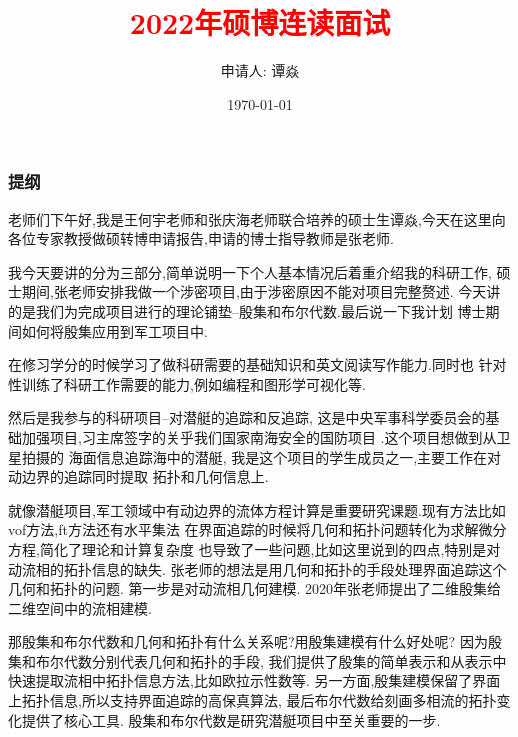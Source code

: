 \documentclass[UTF8]{ctexbeamer}	%
\title{\textcolor{red}{2022年硕博连读面试}}
\author{申请人: 谭焱 
 }
\institute{\small{现硕士导师: 王何宇 、张庆海 \newline 拟转博士指导教师: 张庆海} \newline   \newline 浙江大学数学科学学院}
\date{\today}
\theoremstyle{plain}
\theoremstyle{definition}
\theoremstyle{remark}
\numberwithin{equation}{section}
\begin{document}
\begin{frame}
  \titlepage
\end{frame}


\begin{frame}
  \frametitle{提纲}
  \tableofcontents
\end{frame}

\begin{frame}
  老师们下午好,我是王何宇老师和张庆海老师联合培养的硕士生谭焱,今天在这里向
  各位专家教授做硕转博申请报告,申请的博士指导教师是张老师.
\end{frame}

\begin{frame}
  我今天要讲的分为三部分,简单说明一下个人基本情况后着重介绍我的科研工作,
  硕士期间,张老师安排我做一个涉密项目,由于涉密原因不能对项目完整赘述.
  今天讲的是我们为完成项目进行的理论铺垫--殷集和布尔代数.最后说一下我计划
  博士期间如何将殷集应用到军工项目中.
\end{frame}

\begin{frame}
  在修习学分的时候学习了做科研需要的基础知识和英文阅读写作能力.同时也
  针对性训练了科研工作需要的能力,例如编程和图形学可视化等.
\end{frame}

\begin{frame}
  然后是我参与的科研项目--对潜艇的追踪和反追踪,
  这是中央军事科学委员会的基础加强项目,习主席签字的关乎我们国家南海安全的国防项目
  .这个项目想做到从卫星拍摄的
  海面信息追踪海中的潜艇,
  我是这个项目的学生成员之一,主要工作在对动边界的追踪同时提取
  拓扑和几何信息上.
\end{frame}

\begin{frame}
  就像潜艇项目,军工领域中有动边界的流体方程计算是重要研究课题.现有方法比如
  vof方法,ft方法还有水平集法
  在界面追踪的时候将几何和拓扑问题转化为求解微分方程,简化了理论和计算复杂度
  也导致了一些问题,比如这里说到的四点,特别是对动流相的拓扑信息的缺失.
  张老师的想法是用几何和拓扑的手段处理界面追踪这个几何和拓扑的问题.
  第一步是对动流相几何建模.
  2020年张老师提出了二维殷集给二维空间中的流相建模.
\end{frame}

\begin{frame}
  那殷集和布尔代数和几何和拓扑有什么关系呢?用殷集建模有什么好处呢?
  因为殷集和布尔代数分别代表几何和拓扑的手段,
  我们提供了殷集的简单表示和从表示中快速提取流相中拓扑信息方法,比如欧拉示性数等.
  另一方面,殷集建模保留了界面上拓扑信息,所以支持界面追踪的高保真算法,
  最后布尔代数给刻画多相流的拓扑变化提供了核心工具.
  殷集和布尔代数是研究潜艇项目中至关重要的一步.
\end{frame}
\end{document}

